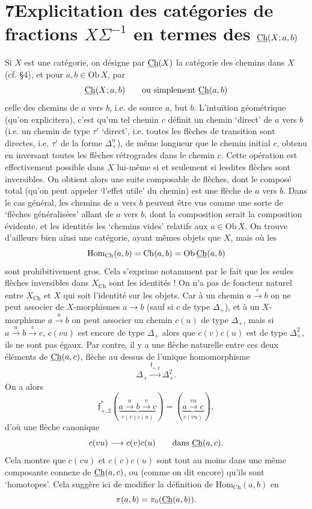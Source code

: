 \section*{7\quad Explicitation des catégories de fractions $X\Sigma^{-1}$ en termes des $\underline{\mathrm{Ch}}(X;a,b)$}

Si $X$ est une catégorie, on désigne par $\underline{\mathrm{Ch}}(X)$ la catégorie des chemins dans $X$ (cf. §4), et pour $a,b \in \mathrm{Ob}\,X$, par
\[
\underline{\mathrm{Ch}}(X;a,b) \qquad \text{ou simplement } \underline{\mathrm{Ch}}(a,b)
\]
celle des chemins de $a$ vers $b$, i.e. de source $a$, but $b$. L'intuition géométrique (qu'on explicitera), c'est qu'un tel chemin $c$ définit un chemin `direct' de $a$ vers $b$ (i.e. un chemin de type $\tau'$ `direct', i.e. toutes les flèches de transition sont directes, i.e. $\tau'$ de la forme $\Delta_+^n$), de même longueur que le chemin initial $c$, obtenu en inversant toutes les flèches rétrogrades dans le chemin $c$. Cette opération est effectivement possible dans $X$ lui-même si et seulement si lesdites flèches sont inversibles. On obtient alors une suite composable de flèches, dont le composé total (qu'on peut appeler `l'effet utile' du chemin)
est une flèche de $a$ vers $b$. Dans le cas général, les chemins de $a$ vers $b$ peuvent être vus comme une sorte de `flèches généralisées' allant de $a$ vers $b$, dont la composition serait la composition évidente, et les identités les `chemins vides' relatifs aux $a \in \mathrm{Ob}\,X$. On trouve d'ailleurs bien ainsi une catégorie, ayant mêmes objets que $X$, mais où les
\[
\mathrm{Hom}_{\mathrm{Ch}}(a,b) = \mathrm{Ch}(a,b) = \mathrm{Ob}\,\underline{\mathrm{Ch}}(a,b)
\]
sont prohibitivement gros. Cela s'exprime notamment par le fait que les seules flèches inversibles dans $X_{\mathrm{Ch}}$ sont les identités ! On n'a pas de foncteur naturel entre $X_{\mathrm{Ch}}$ et $X$ qui soit l'identité sur les objets. Car à un chemin $a \xrightarrow{c} b$ on ne peut associer de $X$-morphismes $a \longrightarrow b$ (sauf si $c$ de type $\Delta_+$), et à un $X$-morphisme $a \xrightarrow{u} b$ on peut associer un chemin $c(u)$ de type $\Delta_+$, mais si $a \xrightarrow{u} b \xrightarrow{v} c$, $c(vu)$ est encore de type $\Delta_+$ alors que $c(v)c(u)$ est de type $\Delta_+^2$, ils ne sont pas égaux. Par contre, il y a une flèche naturelle entre ces deux éléments de $\underline{\mathrm{Ch}}(a,c)$, flèche au dessus de l'unique homomorphisme
\[
\Delta_+ \xrightarrow{\mathfrak{f}_{+,2}} \Delta_+^2.
\]
On a alors
\[
\mathfrak{f}_{+,2}^*(\underbrace{a \xrightarrow{u} b \xrightarrow{v} c}_{c(v)c(u)}) = (\underbrace{a \xrightarrow{vu} c}_{c(vu)}),
\]
d'où une flèche canonique
\[
c(vu) \longrightarrow c(v)c(u) \qquad \text{dans } \underline{\mathrm{Ch}}(a,c).
\]
Cela montre que $c(vu)$ et $c(v)c(u)$ sont tout au moins dans une même composante connexe de $\underline{\mathrm{Ch}}(a,c)$, ou (comme on dit encore) qu'ils sont `homotopes'. Cela suggère ici de modifier la définition de $\mathrm{Hom}_{\mathrm{Ch}}(a,b)$ en
\[
\pi(a,b) = \pi_0(\underline{\mathrm{Ch}}(a,b)).
\]

